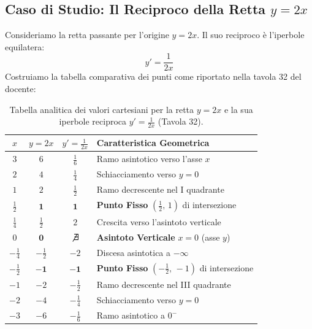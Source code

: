 \documentclass[11pt,a4paper,oneside]{report}
\renewcommand{\arraystretch}{1.4}
\begin{document}
\subsection*{Caso di Studio: Il Reciproco della Retta $y = 2x$}
Consideriamo la retta passante per l'origine $y = 2x$. Il suo reciproco \`e l'iperbole equilatera:
\begin{equation}
    y' = \frac{1}{2x}
\end{equation}
Costruiamo la tabella comparativa dei punti come riportato nella tavola 32 del docente:

\begin{table}[htbp]
\centering
\small
\renewcommand{\arraystretch}{1.3}
\begin{tabular}{|c|c|c|l|}
\hline
\textbf{$x$} & \textbf{$y = 2x$} & \textbf{$y' = \frac{1}{2x}$} & \textbf{Caratteristica Geometrica} \\
\hline
$3$ & $6$ & $\frac{1}{6}$ & Ramo asintotico verso l'asse $x$ \\
$2$ & $4$ & $\frac{1}{4}$ & Schiacciamento verso $y = 0$ \\
$1$ & $2$ & $\frac{1}{2}$ & Ramo decrescente nel I quadrante \\
$\frac{1}{2}$ & $\mathbf{1}$ & $\mathbf{1}$ & \textbf{Punto Fisso} $\left(\frac{1}{2}, \, 1\right)$ di intersezione \\
$\frac{1}{4}$ & $\frac{1}{2}$ & $2$ & Crescita verso l'asintoto verticale \\
$0$ & $\mathbf{0}$ & $\bm{\not\exists}$ & \textbf{Asintoto Verticale} $x = 0$ (asse $y$) \\
$-\frac{1}{4}$ & $-\frac{1}{2}$ & $-2$ & Discesa asintotica a $-\infty$ \\
$-\frac{1}{2}$ & $\mathbf{-1}$ & $\mathbf{-1}$ & \textbf{Punto Fisso} $\left(-\frac{1}{2}, \, -1\right)$ di intersezione \\
$-1$ & $-2$ & $-\frac{1}{2}$ & Ramo decrescente nel III quadrante \\
$-2$ & $-4$ & $-\frac{1}{4}$ & Schiacciamento verso $y = 0$ \\
$-3$ & $-6$ & $-\frac{1}{6}$ & Ramo asintotico a $0^-$ \\
\hline
\end{tabular}
\caption{Tabella analitica dei valori cartesiani per la retta $y = 2x$ e la sua iperbole reciproca $y' = \frac{1}{2x}$ (Tavola 32).}
\label{tab:valori_reciproco_retta}
\end{table}
\end{document}
